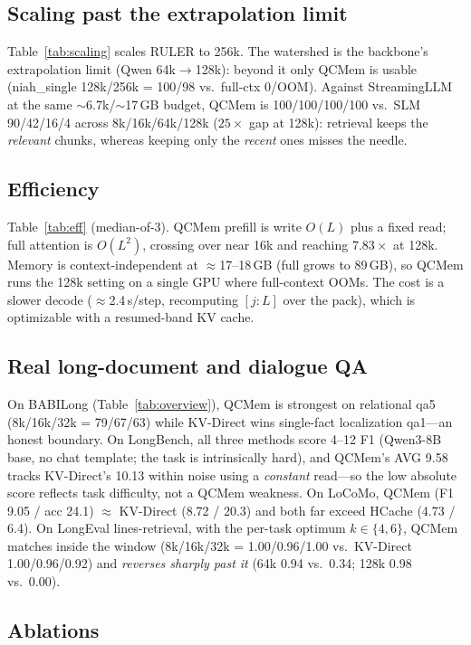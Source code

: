 \subsection{Scaling past the extrapolation limit}
Table~\ref{tab:scaling} scales RULER to 256k. The watershed is the backbone's
extrapolation limit (Qwen 64k$\to$128k): beyond it only QCMem is usable
(niah\_single 128k/256k = 100/98 vs.\ full-ctx 0/OOM). Against StreamingLLM at
the same $\sim$6.7k/$\sim$17\,GB budget, QCMem is 100/100/100/100 vs.\ SLM
90/42/16/4 across 8k/16k/64k/128k ($25\times$ gap at 128k): retrieval keeps the
\emph{relevant} chunks, whereas keeping only the \emph{recent} ones misses the
needle.



\subsection{Efficiency}
Table~\ref{tab:eff} (median-of-3). QCMem prefill is write $O(L)$ plus a fixed
read; full attention is $O(L^2)$, crossing over near 16k and reaching
$7.83\times$ at 128k. Memory is context-independent at $\approx$17--18\,GB
(full grows to 89\,GB), so QCMem runs the 128k setting on a single GPU where
full-context OOMs. The cost is a slower decode ($\approx$2.4\,s/step,
recomputing $[j{:}L]$ over the pack), which is optimizable with a resumed-band
KV cache.



\subsection{Real long-document and dialogue QA}
On BABILong (Table~\ref{tab:overview}), QCMem is strongest on relational qa5
(8k/16k/32k = 79/67/63) while KV-Direct wins single-fact localization qa1---an
honest boundary. On LongBench, all three methods score 4--12 F1 (Qwen3-8B base,
no chat template; the task is intrinsically hard), and QCMem's AVG 9.58 tracks
KV-Direct's 10.13 within noise using a \emph{constant} read---so the low
absolute score reflects task difficulty, not a QCMem weakness. On LoCoMo,
QCMem (F1 9.05 / acc 24.1) $\approx$ KV-Direct (8.72 / 20.3) and both far
exceed HCache (4.73 / 6.4). On LongEval lines-retrieval, with the per-task
optimum $k{\in}\{4,6\}$, QCMem matches inside the window
(8k/16k/32k = 1.00/0.96/1.00 vs.\ KV-Direct 1.00/0.96/0.92) and \emph{reverses
sharply past it} (64k 0.94 vs.\ 0.34; 128k 0.98 vs.\ 0.00).

\subsection{Ablations}
